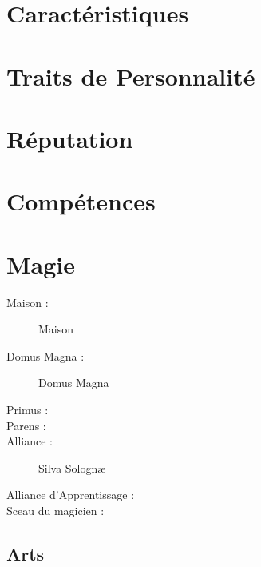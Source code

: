 \section*{Caractéristiques}


\caractableMP



\begin{multicols*}{2}

\longVFQs

\section*{Traits de Personnalité}

\traitslong

\section*{Réputation}

\reputationslong



\section*{Compétences}

\abilitieslong

\end{multicols*}

\pagebreak

\section*{Magie}
\begin{multicols}{2}
\begin{description}
\item[Maison :] Maison
\item[Domus Magna :] Domus Magna
\item[Primus :]
\item[Parens :]
\item[Alliance :] Silva Solognæ
\item[Alliance d'Apprentissage :]
\item[Sceau du magicien :] \magussigil
\end{description}
\end{multicols}
\subsection*{Arts}

